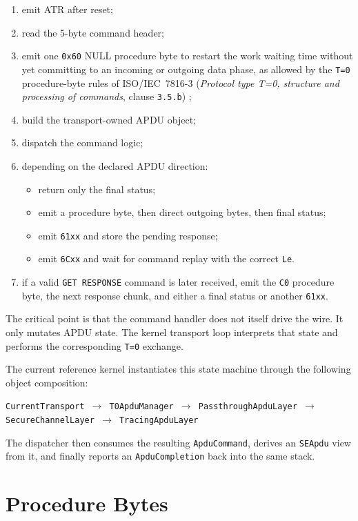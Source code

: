 \begin{enumerate}
\item emit ATR after reset;
\item read the 5-byte command header;
\item emit one \texttt{0x60} NULL procedure byte to restart the work
  waiting time without yet committing to an incoming or outgoing data
  phase, as allowed by the \texttt{T=0} procedure-byte rules of
  ISO/IEC~7816-3 (\emph{Protocol type T=0, structure and processing of
  commands}, clause \texttt{3.5.b}) \cite{iso7816-3};
\item build the transport-owned APDU object;
\item dispatch the command logic;
\item depending on the declared APDU direction:
  \begin{itemize}
  \item return only the final status;
  \item emit a procedure byte, then direct outgoing bytes, then final
    status;
  \item emit \texttt{61xx} and store the pending response;
  \item emit \texttt{6Cxx} and wait for command replay with the correct
    \texttt{Le}.
  \end{itemize}
\item if a valid \texttt{GET RESPONSE} command is later received, emit
  the \texttt{C0} procedure byte, the next response chunk, and either a
  final status or another \texttt{61xx}.
\end{enumerate}

The critical point is that the command handler does not itself drive the
wire. It only mutates APDU state. The kernel transport loop interprets
that state and performs the corresponding \texttt{T=0} exchange.

The current reference kernel instantiates this state machine through the
following object composition:
\begin{center}
\texttt{CurrentTransport $\rightarrow$ T0ApduManager $\rightarrow$ PassthroughApduLayer $\rightarrow$ SecureChannelLayer $\rightarrow$ TracingApduLayer}
\end{center}

The dispatcher then consumes the resulting \texttt{ApduCommand},
derives an \texttt{SEApdu} view from it, and finally reports an
\texttt{ApduCompletion} back into the same stack.

\section{Procedure Bytes}

